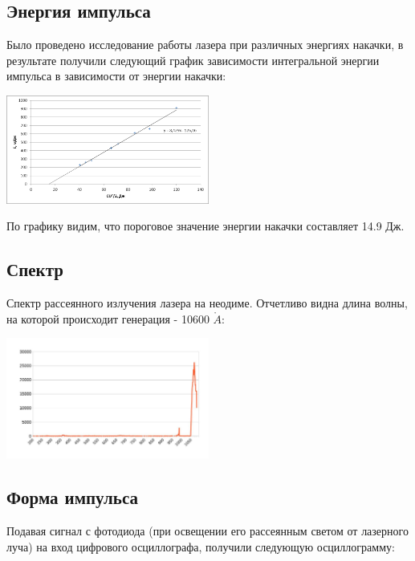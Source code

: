 \documentclass[twocolumn]{article}
\begin{document}
          
        
    
\subsection{Энергия импульса}Было проведено исследование работы лазера при различных энергиях
накачки, в результате получили следующий график зависимости интегральной
энергии импульса в зависимости от энергии накачки:

        
    \begin{center}
    \includegraphics[width=0.5\textwidth]{LEMPH Report_files/LEMPH Report_22_0.png}
    \par
    \end{center}
    
            
        
    
По графику видим, что пороговое значение энергии накачки составляет 14.9 Дж.
\subsection{Спектр}Спектр рассеянного излучения лазера на неодиме. Отчетливо видна длина
волны, на которой происходит генерация - 10600 $\mathring{A}$:

  
    
     
    \begin{center}
    \includegraphics[width=0.5\textwidth]{LEMPH Report_files/LEMPH Report_26_0.jpeg}
    \par
    \end{center}
    
            
        
    
\subsection{Форма импульса}Подавая сигнал с фотодиода (при освещении его рассеянным светом от
лазерного луча) на вход цифрового осциллографа, получили следующую
осциллограмму:
\end{document}
